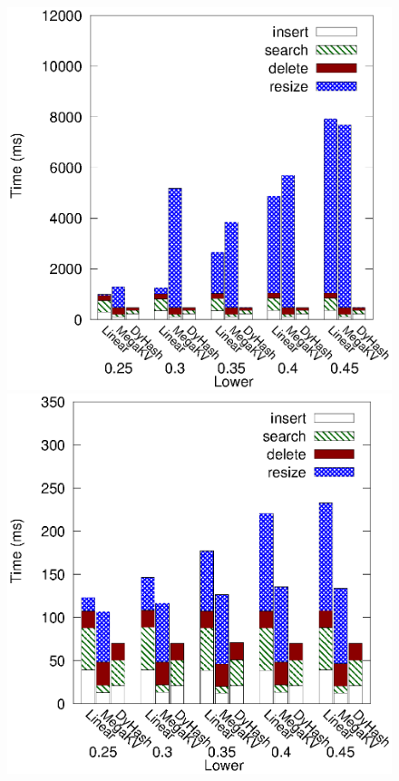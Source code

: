 \begin{figure}[h]
\begin{minipage}{0.18\linewidth}
		\centerline{\dsreddit}
	\end{minipage}
	\hfill
	\begin{minipage}{0.18\linewidth}\centering
		\includegraphics[width=\linewidth]{pic/dynamic/tpch/diff_lower.eps}
		\centerline{\dstpch}
	\end{minipage}
	\hfill
	\begin{minipage}{0.18\linewidth}\centering
		\includegraphics[width=\linewidth]{pic/dynamic/ali/diff_lower.eps}

\end{minipage}
\end{figure}
